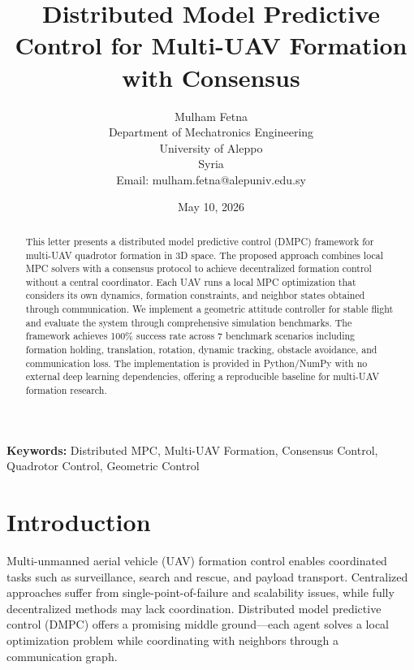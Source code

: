 \documentclass[10pt,article]{article}
\newenvironment{keywords}{\textbf{Keywords: }}{}
\begin{document}
\title{Distributed Model Predictive Control for Multi-UAV Formation with Consensus}

\author{Mulham Fetna \\
Department of Mechatronics Engineering \\
University of Aleppo \\
Syria \\
Email: mulham.fetna@alepuniv.edu.sy}

\date{May 10, 2026}

\maketitle

\begin{abstract}
This letter presents a distributed model predictive control (DMPC) framework for multi-UAV quadrotor formation in 3D space. The proposed approach combines local MPC solvers with a consensus protocol to achieve decentralized formation control without a central coordinator. Each UAV runs a local MPC optimization that considers its own dynamics, formation constraints, and neighbor states obtained through communication. We implement a geometric attitude controller for stable flight and evaluate the system through comprehensive simulation benchmarks. The framework achieves 100\% success rate across 7 benchmark scenarios including formation holding, translation, rotation, dynamic tracking, obstacle avoidance, and communication loss. The implementation is provided in Python/NumPy with no external deep learning dependencies, offering a reproducible baseline for multi-UAV formation research.
\end{abstract}

\begin{keywords}
Distributed MPC, Multi-UAV Formation, Consensus Control, Quadrotor Control, Geometric Control
\end{keywords}

\section{Introduction}

Multi-unmanned aerial vehicle (UAV) formation control enables coordinated tasks such as surveillance, search and rescue, and payload transport. Centralized approaches suffer from single-point-of-failure and scalability issues, while fully decentralized methods may lack coordination. Distributed model predictive control (DMPC) offers a promising middle ground—each agent solves a local optimization problem while coordinating with neighbors through a communication graph.
\end{document}

